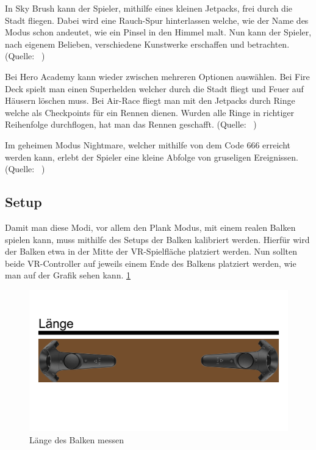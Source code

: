 In Sky Brush kann der Spieler, mithilfe eines kleinen Jetpacks, frei durch die Stadt fliegen.
Dabei wird eine Rauch-Spur hinterlassen welche, wie der Name des Modus schon andeutet, wie ein Pinsel in den Himmel malt.
Nun kann der Spieler, nach eigenem Belieben, verschiedene Kunstwerke erschaffen und betrachten.
(Quelle: ~\cite{ToastGames_2021_Steam})

Bei Hero Academy kann wieder zwischen mehreren Optionen auswählen.
Bei Fire Deck spielt man einen Superhelden welcher durch die Stadt fliegt und Feuer auf Häusern löschen muss.
Bei Air-Race fliegt man mit den Jetpacks durch Ringe welche als Checkpoints für ein Rennen dienen.
Wurden alle Ringe in richtiger Reihenfolge durchflogen, hat man das Rennen geschafft.
(Quelle: ~\cite{ToastGames_2021_Steam})

Im geheimen Modus Nightmare, welcher mithilfe von dem Code 666 erreicht werden kann, erlebt der Spieler eine kleine Abfolge von gruseligen Ereignissen.
(Quelle: ~\cite{ToastGames_2021_VivePort})

\subsection{Setup}
\label{sec:richiesplankexperience_setup}

Damit man diese Modi, vor allem den Plank Modus, mit einem realen Balken spielen kann, muss mithilfe des Setups der Balken kalibriert werden.
Hierfür wird der Balken etwa in der Mitte der VR-Spielfläche platziert werden.
Nun sollten beide VR-Controller auf jeweils einem Ende des Balkens platziert werden, wie man auf der Grafik sehen kann.
\ref{fig:beam_length_measurement} %

\begin {figure}
    \includegraphics[scale=0.18]{pics/beam_length_measurement}
    \caption{L\"ange des Balken messen}
    \label{fig:beam_length_measurement}
\end {figure}

